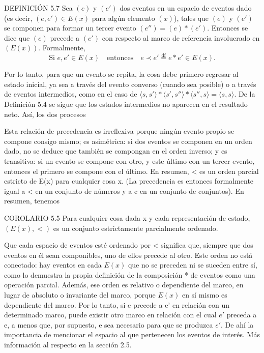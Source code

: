 \begin{justifying}
    \bigskip

    \noindent DEFINICIÓN 5.7 Sea $(e)$ y $(e')$ dos eventos en un espacio de eventos dado (es decir, $(e,e')\in E(x)$ para algún elemento $(x)$), tales que $(e)$ y $(e')$ se componen para formar un tercer evento $(e'') = (e)\ast (e')$. 
    Entonces se dice que $(e)$ precede a $(e')$ con respecto al marco de referencia involucrado en $(E(x))$. Formalmente,
    \[
    \text{Si } e,e'\in E(x)\quad\text{entonces}\quad
    e\prec e'\overset{\mathrm{df}}{=} e\ast e'\in E(x).
    \]

    Por lo tanto, para que un evento se repita, la cosa debe primero regresar al estado inicial, ya sea a través del 
    evento converso (cuando sea posible) o a través de eventos intermedios, como en el caso de $\langle s, s' \rangle * \langle s', s'' \rangle * \langle s'', s \rangle = \langle s, s \rangle$. 
    De la Definición 5.4 se sigue que los estados intermedios no aparecen en el resultado neto. Así, los dos procesos


  \bigskip



    Esta relación de precedencia es irreflexiva porque ningún evento propio se compone consigo mismo; es asimétrica: si dos eventos se componen en un orden dado, no se deduce que también se compongan en el orden inverso; y es transitiva: si un evento se compone con otro, y este último con un tercer evento, entonces el primero se compone con el último. En resumen, < es un orden parcial estricto de E(x) para cualquier cosa x. (La precedencia es entonces formalmente igual a < en un conjunto de números y a c en un conjunto de conjuntos). En resumen, tenemos
    
    \bigskip COROLARIO 5.5 Para cualquier cosa dada x y cada representación de estado,\bigskip $(E(x), <)$ es un conjunto estrictamente parcialmente ordenado.
    
    Que cada espacio de eventos esté ordenado por < significa que, siempre que dos eventos en él sean componibles, uno de ellos precede al otro. Este orden no está conectado: hay eventos en cada $E(x)$ que no se preceden ni se suceden entre sí, como lo demuestra la propia definición de la composición * de eventos como una operación parcial. Además, ese orden es relativo o dependiente del marco, en lugar de absoluto o invariante del marco, porque $E(x)$ en sí mismo es dependiente del marco. Por lo tanto, si e precede a e' en relación con un determinado marco, puede existir otro marco en relación con el cual $e'$ preceda a e, a menos que, por supuesto, e sea necesario para que se produzca $e'$. De ahí la importancia de mencionar el espacio al que pertenecen los eventos de interés. Más información al respecto en la sección 2.5.


\end{justifying}
